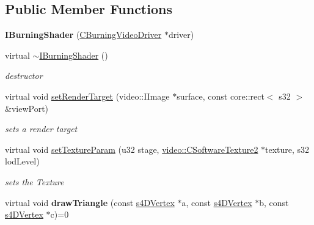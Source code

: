\subsection*{Public Member Functions}
\begin{DoxyCompactItemize}
\item 
\hypertarget{classirr_1_1video_1_1_i_burning_shader_aab166b3c239d1d1a11e75e5e7001fa2a}{{\bfseries I\-Burning\-Shader} (\hyperlink{classirr_1_1video_1_1_c_burning_video_driver}{C\-Burning\-Video\-Driver} $\ast$driver)}\label{classirr_1_1video_1_1_i_burning_shader_aab166b3c239d1d1a11e75e5e7001fa2a}

\item 
\hypertarget{classirr_1_1video_1_1_i_burning_shader_a0314da3e4242ea9cd4a14cdfdaa4f8d1}{virtual \hyperlink{classirr_1_1video_1_1_i_burning_shader_a0314da3e4242ea9cd4a14cdfdaa4f8d1}{$\sim$\-I\-Burning\-Shader} ()}\label{classirr_1_1video_1_1_i_burning_shader_a0314da3e4242ea9cd4a14cdfdaa4f8d1}

\begin{DoxyCompactList}\small\item\em destructor \end{DoxyCompactList}\item 
\hypertarget{classirr_1_1video_1_1_i_burning_shader_acc453f24d7edc38cc2e4a924f00758f6}{virtual void \hyperlink{classirr_1_1video_1_1_i_burning_shader_acc453f24d7edc38cc2e4a924f00758f6}{set\-Render\-Target} (video\-::\-I\-Image $\ast$surface, const core\-::rect$<$ s32 $>$ \&view\-Port)}\label{classirr_1_1video_1_1_i_burning_shader_acc453f24d7edc38cc2e4a924f00758f6}

\begin{DoxyCompactList}\small\item\em sets a render target \end{DoxyCompactList}\item 
\hypertarget{classirr_1_1video_1_1_i_burning_shader_a309289362ec01018181a39cc5f9213bc}{virtual void \hyperlink{classirr_1_1video_1_1_i_burning_shader_a309289362ec01018181a39cc5f9213bc}{set\-Texture\-Param} (u32 stage, \hyperlink{classirr_1_1video_1_1_c_software_texture2}{video\-::\-C\-Software\-Texture2} $\ast$texture, s32 lod\-Level)}\label{classirr_1_1video_1_1_i_burning_shader_a309289362ec01018181a39cc5f9213bc}

\begin{DoxyCompactList}\small\item\em sets the Texture \end{DoxyCompactList}\item 
\hypertarget{classirr_1_1video_1_1_i_burning_shader_a391f09fbbc39a36ce295c6115b2058f0}{virtual void {\bfseries draw\-Triangle} (const \hyperlink{structirr_1_1video_1_1s4_d_vertex}{s4\-D\-Vertex} $\ast$a, const \hyperlink{structirr_1_1video_1_1s4_d_vertex}{s4\-D\-Vertex} $\ast$b, const \hyperlink{structirr_1_1video_1_1s4_d_vertex}{s4\-D\-Vertex} $\ast$c)=0}\label{classirr_1_1video_1_1_i_burning_shader_a391f09fbbc39a36ce295c6115b2058f0}


\end{DoxyCompactItemize}
